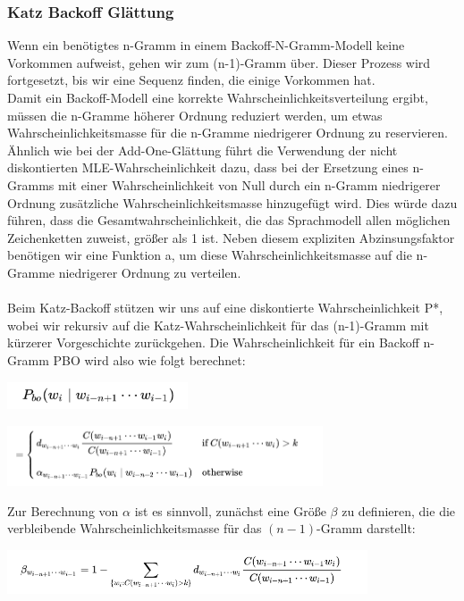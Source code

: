 \documentclass[12pt]{article}
\begin{document}
\subsubsection{Katz Backoff Glättung}
\quad Wenn ein benötigtes n-Gramm in einem Backoff-N-Gramm-Modell keine Vorkommen aufweist, gehen wir zum (n-1)-Gramm über. Dieser Prozess wird fortgesetzt, bis wir eine Sequenz finden, die einige Vorkommen hat.
\\ Damit ein Backoff-Modell eine korrekte Wahrscheinlichkeitsverteilung ergibt, müssen die n-Gramme höherer Ordnung reduziert werden, um etwas Wahrscheinlichkeitsmasse für die n-Gramme niedrigerer Ordnung zu reservieren. Ähnlich wie bei der Add-One-Glättung führt die Verwendung der nicht diskontierten MLE-Wahrscheinlichkeit dazu, dass bei der Ersetzung eines n-Gramms mit einer Wahrscheinlichkeit von Null durch ein n-Gramm niedrigerer Ordnung zusätzliche Wahrscheinlichkeitsmasse hinzugefügt wird. Dies würde dazu führen, dass die Gesamtwahrscheinlichkeit, die das Sprachmodell allen möglichen Zeichenketten zuweist, größer als 1 ist. Neben diesem expliziten Abzinsungsfaktor benötigen wir eine Funktion a, um diese Wahrscheinlichkeitsmasse auf die n-Gramme niedrigerer Ordnung zu verteilen.
\\ \\Beim Katz-Backoff stützen wir uns auf eine diskontierte Wahrscheinlichkeit P*, wobei wir rekursiv auf die Katz-Wahrscheinlichkeit für das (n-1)-Gramm mit kürzerer Vorgeschichte zurückgehen. Die Wahrscheinlichkeit für ein Backoff n-Gramm PBO wird also wie folgt berechnet:
\begin{center}
	\includegraphics[width=0.4\textwidth]{statics/Borisov/8.PNG}
\end{center}
\begin{center}
	\includegraphics[width=0.7\textwidth]{statics/Borisov/9.PNG}
\end{center}

\quad Zur Berechnung von $\alpha$ ist es sinnvoll, zunächst eine Größe $\beta$ zu definieren, die die verbleibende Wahrscheinlichkeitsmasse für das $(n - 1)$-Gramm darstellt:


\begin{center}
	\includegraphics[width=0.8\textwidth]{statics/Borisov/10.PNG}
\end{center}
\end{document}
